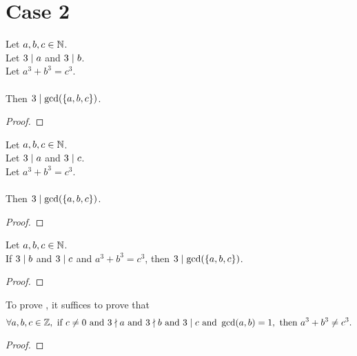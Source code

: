 \chapter*{Case 2}

\begin{lemma}
    \label{lmm:three_dvd_gcd_of_dvd_a_of_dvd_b}
    \leanok
    Let $a, b, c \in \mathbb{N}$. \\
    Let $3 \mid a$ and $3 \mid b$. \\
    Let $a ^ 3 + b ^ 3 = c ^ 3$. \\\\
    Then $3 \mid \gcd(\left\{a, b, c\right\})$.
\end{lemma}
\begin{proof}
    \leanok
\end{proof}

\begin{lemma}
    \label{lmm:three_dvd_gcd_of_dvd_a_of_dvd_c}
    \leanok
    Let $a, b, c \in \mathbb{N}$. \\
    Let $3 \mid a$ and $3 \mid c$. \\
    Let $a ^ 3 + b ^ 3 = c ^ 3$. \\\\
    Then $3 \mid \gcd(\left\{a, b, c\right\})$.
\end{lemma}
\begin{proof}
    \leanok
\end{proof}

\begin{lemma}
    \label{lmm:three_dvd_gcd_of_dvd_b_of_dvd_c}
    \leanok
    Let $a, b, c \in \mathbb{N}$. \\
    If $3 \mid b$ and $3 \mid c$ and $a ^ 3 + b ^ 3 = c ^ 3$, then $3 \mid \gcd(\left\{a, b, c\right\})$.
\end{lemma}
\begin{proof}
    \leanok
\end{proof}

\begin{theorem}
    \label{thm:fermatLastTheoremThree_of_three_dvd_only_c}
    \leanok
    To prove , it suffices to prove that
    $$\forall a, b, c \in \mathbb{Z}, \text{ if } c \neq 0 \text{ and } 3 \nmid a \text{ and }
    3 \nmid b \text{ and } 3 \mid c \text{ and } \gcd(a,b)=1,
    \text{ then } a^3 + b^3 \neq c^3.$$
\end{theorem}
\begin{proof}
    \leanok
\end{proof}

